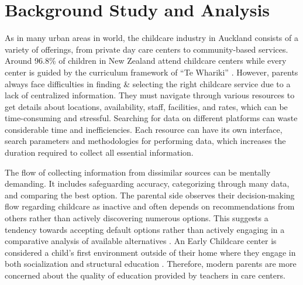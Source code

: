 
\section{Background Study and Analysis}
As in many urban areas in world, the childcare industry in Auckland consists of a variety of offerings, from private day care centers to community-based services. Around 96.8\% of children in New Zealand attend childcare centers while every center is guided by the curriculum framework of “Te Whariki” \cite{ministryofeducation_2023}. However, parents always face difficulties in finding \& selecting the right childcare service due to a lack of centralized information. They must navigate through various resources to get details about locations, availability, staff, facilities, and rates, which can be time-consuming and stressful. Searching for data on different platforms can waste considerable time and inefficiencies. Each resource can have its own interface, search parameters and methodologies for performing data, which increases the duration required to collect all essential information.


The flow of collecting information from dissimilar sources can be mentally demanding. It includes safeguarding accuracy, categorizing through many data, and comparing the best option. The parental side observes their decision-making flow regarding childcare as inactive and often depends on recommendations from others rather than actively discovering numerous options. This suggests a tendency towards accepting default options rather than actively engaging in a comparative analysis of available alternatives \cite{Barraclough_Smith_1996}. An Early Childcare center is considered a child’s first environment outside of their home where they engage in both socialization and structural education \cite{Fenech_Sumsion_2007}. Therefore, modern parents are more concerned about the quality of education provided by teachers in care centers.